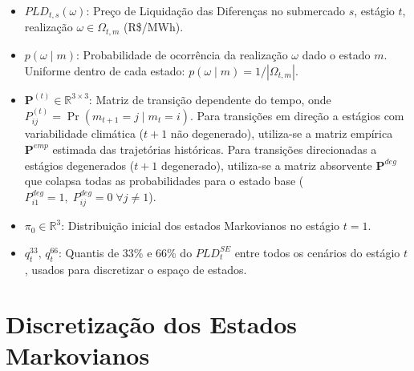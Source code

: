 \documentclass{article}
\begin{document}
\begin{itemize}
    \item $PLD_{t,s}(\omega)$: Preço de Liquidação das Diferenças no submercado $s$,
    estágio $t$, realização $\omega \in \Omega_{t,m}$ (R\$/MWh).

    \item $p(\omega \mid m)$: Probabilidade de ocorrência da realização $\omega$ dado o estado $m$.
    Uniforme dentro de cada estado: $p(\omega \mid m) = 1 / |\Omega_{t,m}|$.

    \item $\mathbf{P}^{(t)} \in \mathbb{R}^{3 \times 3}$: Matriz de transição dependente do
    tempo, onde $P^{(t)}_{ij} = \Pr(m_{t+1} = j \mid m_t = i)$. Para transições em direção
    a estágios com variabilidade climática ($t+1$ não degenerado), utiliza-se a matriz
    empírica $\mathbf{P}^{emp}$ estimada das trajetórias históricas. Para transições
    direcionadas a estágios degenerados ($t+1$ degenerado), utiliza-se a matriz absorvente
    $\mathbf{P}^{deg}$ que colapsa todas as probabilidades para o estado base
    ($P^{deg}_{i1} = 1,\; P^{deg}_{ij} = 0\; \forall j \neq 1$).

    \item $\pi_0 \in \mathbb{R}^3$: Distribuição inicial dos estados Markovianos no estágio $t=1$.

    \item $q^{33}_t,\, q^{66}_t$: Quantis de 33\% e 66\% do $PLD^{SE}_t$ entre todos os cenários
    do estágio $t$, usados para discretizar o espaço de estados.

\end{itemize}

\section{Discretização dos Estados Markovianos}
\end{document}
